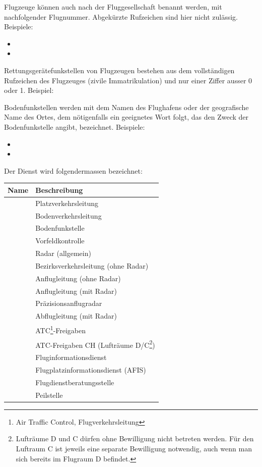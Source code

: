 {Flugzeuge können auch nach der Fluggesellschaft benannt werden, mit nachfolgender Flugnummer. Abgekürzte Rufzeichen sind hier nicht zulässig. Beispiele:
\begin{itemize}
 \item {}
 \item {}
\end{itemize}

Rettungsgerätefunkstellen von Flugzeugen bestehen aus dem vollständigen Rufzeichen des Flugzeuges (zivile Immatrikulation) und nur einer Ziffer ausser 0 oder 1. Beispiel: 

Bodenfunkstellen werden mit dem Namen des Flughafens oder der geografische Name des Ortes, dem nötigenfalls ein geeignetes Wort folgt, das den Zweck der Bodenfunkstelle angibt, bezeichnet. Beispiele:
\begin{itemize}
 \item {}
 \item {}
\end{itemize}

Der Dienst wird folgendermassen bezeichnet:

\begin{longtabu}{ll}
\bfseries Name & \bfseries Beschreibung \\ \toprule 
\endhead {}
 & Platzverkehrsleitung \\ \midrule
{} & Bodenverkehrsleitung \\ \midrule
{} & Bodenfunkstelle \\ \midrule
{} & Vorfeldkontrolle \\ \midrule
{} & Radar (allgemein) \\ \midrule
{} & Bezirksverkehrsleitung (ohne Radar) \\ \midrule
{} & Anflugleitung (ohne Radar) \\ \midrule
{} & Anflugleitung (mit Radar) \\ \midrule
{} & Präzisionsanflugradar \\ \midrule
{} & Abflugleitung (mit Radar) \\ \midrule
{} & ATC\footnote{Air Traffic Control, Flugverkehrsleitung}-Freigaben \\ \midrule
{} & ATC-Freigaben CH (Lufträume D/C\footnote{Lufträume D und C dürfen ohne Bewilligung nicht betreten werden. Für den Luftraum C ist jeweils eine separate Bewilligung notwendig, auch wenn man sich bereits im Flugraum D befindet.}) \\ \midrule
{} & Fluginformationsdienst \\ \midrule
{} & Flugplatzinformationsdienst (AFIS) \\ \midrule
{} & Flugdienstberatungsstelle \\ \midrule
{} & Peilstelle \\ \midrule
\end{longtabu}

}
